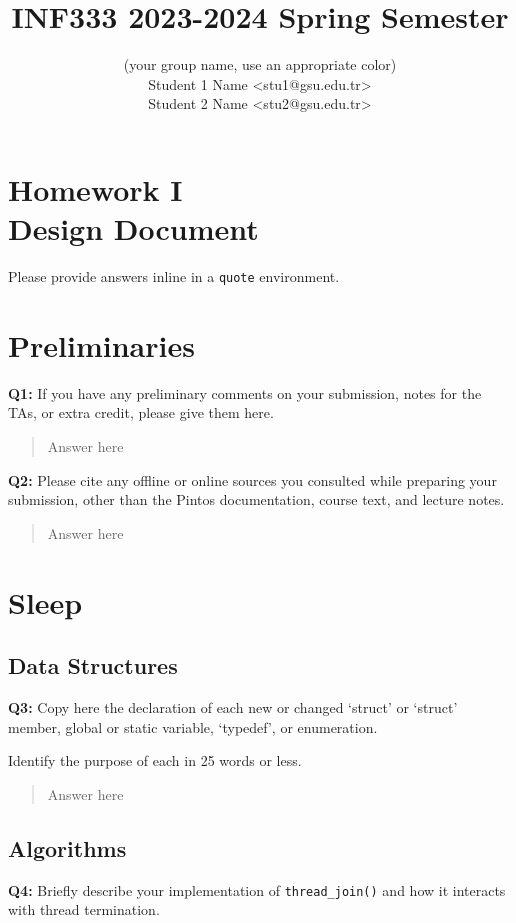 \documentclass[a4paper,11pt]{paper}
\title{INF333 2023-2024 Spring Semester}
\author{
\textbf{\color{blue}{Şirinler}} {\small(your group name, use an appropriate color)}
\\ Student 1 Name <stu1@gsu.edu.tr>
\\ Student 2 Name <stu2@gsu.edu.tr>}
\begin{document}
\maketitle

\section*{\LARGE Homework I \\
Design Document}

Please provide answers inline in a \texttt{quote} environment.


\section{Preliminaries}

\textbf{Q1:} If you have any preliminary comments on your submission, notes for
the TAs, or extra credit, please give them here.
\begin{quote}
  Answer here
\end{quote}


\textbf{Q2:} Please cite any offline or online sources you consulted while
preparing your submission, other than the Pintos documentation, course text, and
lecture notes.

\begin{quote}
  Answer here
\end{quote}


\section{Sleep}

\subsection{Data Structures}

\textbf{Q3:} Copy here the declaration of each new or changed `struct' or
`struct' member, global or static variable, `typedef', or enumeration.

Identify the purpose of each in 25 words or less.
\begin{quote}
  Answer here
\end{quote}


\subsection{Algorithms}


\textbf{Q4:} Briefly describe your implementation of \texttt{thread\_join()} and
how it interacts with thread termination.
\end{document}
